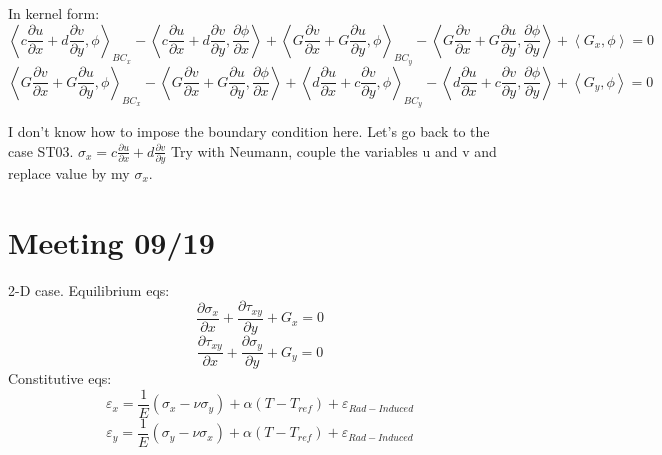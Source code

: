 \documentclass[11pt,letterpaper]{article}
\begin{document}
In kernel form:
\begin{equation}
\left< c \frac{\partial u}{\partial x} + d \frac{\partial v}{\partial y}, \phi \right>_{BC_x} - \left< c \frac{\partial u}{\partial x} + d \frac{\partial v}{\partial y}, \frac{\partial \phi}{\partial x} \right> + \left< G \frac{\partial v}{\partial x} + G \frac{\partial u}{\partial y}, \phi \right>_{BC_y} - \left< G \frac{\partial v}{\partial x} + G \frac{\partial u}{\partial y}, \frac{\partial \phi}{\partial y} \right>
+ \left< G_x , \phi \right> = 0
\end{equation}
\begin{equation}
\left< G \frac{\partial v}{\partial x} + G \frac{\partial u}{\partial y}, \phi \right>_{BC_x} - \left< G \frac{\partial v}{\partial x} + G \frac{\partial u}{\partial y}, \frac{\partial \phi}{\partial x} \right> +
\left< d \frac{\partial u}{\partial x} + c \frac{\partial v}{\partial y}, \phi \right>_{BC_y} - \left< d \frac{\partial u}{\partial x} + c \frac{\partial v}{\partial y}, \frac{\partial \phi}{\partial y} \right>
+ \left< G_y , \phi \right> = 0
\end{equation}

I don't know how to impose the boundary condition here. Let's go back to the case ST03.
$\sigma_x = c\frac{\partial u}{\partial x} + d\frac{\partial v}{\partial y}$
Try with Neumann, couple the variables u and v and replace value by my $\sigma_x$.

\section{Meeting 09/19}

2-D case.
Equilibrium eqs:
\begin{equation}
\frac{\partial \sigma_x}{\partial x} + \frac{\partial \tau_{xy}}{\partial y} + G_x = 0
\end{equation}
\begin{equation}
\frac{\partial \tau_{xy}}{\partial x} + \frac{\partial \sigma_y}{\partial y} + G_y = 0
\end{equation}
Constitutive eqs:
\begin{equation}
\varepsilon_x = \frac{1}{E} (\sigma_x - \nu \sigma_y) + \alpha (T-T_{ref}) + \varepsilon_{Rad-Induced}
\end{equation}
\begin{equation}
\varepsilon_y = \frac{1}{E} (\sigma_y - \nu \sigma_x) + \alpha (T-T_{ref}) + \varepsilon_{Rad-Induced}
\end{equation}
\end{document}

